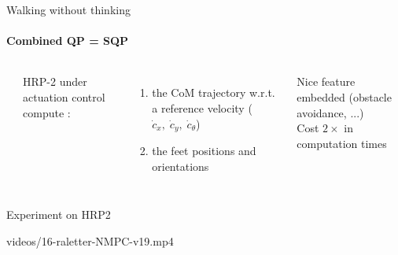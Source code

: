 

\begin{frame}{Walking without thinking}
\framesubtitle{Combined QP = SQP}

\begin{columns}

\vspace*{2.5cm}
\begin{minipage}[t]{0.5\textwidth}
  \begin{center}
    \scalebox{0.8}{} \\
  \end{center}
\end{minipage}

\vspace*{1.5cm}
\begin{minipage}[t]{\textwidth}
  HRP-2 under actuation control compute : 
    \begin{enumerate}
    \item the CoM trajectory w.r.t. a
        reference velocity ($\dot{c}_x,\;\dot{c}_y,\;\dot{c}_{\theta} $)
    \item the feet positions and orientations
    \end{enumerate}
  Nice feature embedded (obstacle avoidance, ...)\\
  Cost $2\times$ in computation times
\end{minipage}
\end{columns}
\end{frame}


\begin{frame}{Experiment on HRP2}
  \begin{center}
    {videos/16-raletter-NMPC-v19.mp4}
  \end{center}
\end{frame}


